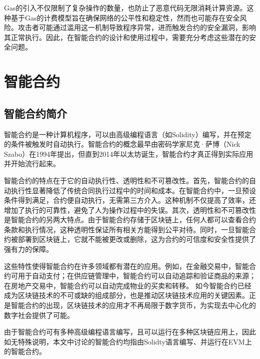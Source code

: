     Gas的引入不仅限制了复杂操作的数量，也防止了恶意代码无限消耗计算资源。这种基于Gas的计费模型旨在确保网络的公平性和稳定性，然而也可能存在安全风险。攻击者可能通过滥用这一机制导致程序异常，进而触发合约的安全漏洞，影响其正常执行。因此，在智能合约的设计和使用过程中，需要充分考虑这些潜在的安全问题。

\section{智能合约}
\label{sec:智能合约}
\subsection{智能合约简介}
\label{sec:智能合约简介}
智能合约是一种计算机程序，可以由高级编程语言（如Solidity）编写，并在预定的条件被触发时自动执行。智能合约的概念最早由密码学家尼克·萨博（Nick Szabo）在1994年提出，但直到2014年以太坊诞生，智能合约才真正得到实际应用并开始流行起来。

智能合约的特点在于它的自动执行性、透明性和不可篡改性。首先，智能合约的自动执行性显著降低了传统合同执行过程中的时间和成本。在智能合约中，一旦预设条件得到满足，合约便自动执行，无需第三方介入。这种机制不仅提高了效率，还增加了执行的可靠性，避免了人为操作过程中的失误。其次，透明性和不可篡改性是智能合约的另两大特点。由于智能合约存储于区块链上，任何人都可以查看合约条款和执行情况，这种透明性保证所有相关方能得到公平对待。同时，一旦智能合约被部署到区块链上，它就不能被更改或删除，这为合约的可信度和安全性提供了强有力的保障。

这些特性使得智能合约在许多领域都有潜在的应用。例如，在金融交易中，智能合约可用于自动支付；在供应链管理中，智能合约可以自动追踪和验证商品的来源；在房地产交易中，智能合约可以自动完成物业的买卖和转移。
如今智能合约已经成为区块链技术的不可或缺的组成部分，也是推动区块链技术应用的关键因素。正是智能合约的出现，区块链技术的应用才不再局限于数字货币，为实现去中心化的数字社会提供了可能。

由于智能合约可有多种高级编程语言编写，且可以运行在多种区块链应用上，因此如无特殊说明，本文中讨论的智能合约均指由Solidty语言编写、并运行在EVM上的智能合约。
